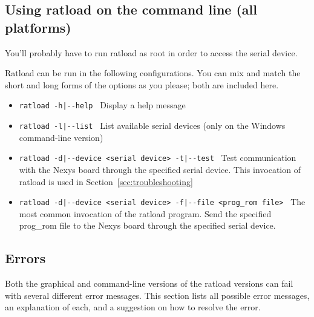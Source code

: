 \documentclass[notitlepage]{article}
\newcommand{\infosign}{\fontencoding{U}\fontfamily{futs}\huge\selectfont\char 116\relax}
\begin{document}
\subsection{Using ratload on the command line (all platforms)}
\begin{infobox}
  {\infosign}You'll probably have to run ratload as root in order to access the serial device.
\end{infobox}
Ratload can be run in the following configurations. You can mix and match the short and long forms of the options as you please; both are included here.
\begin{itemize}
\item \texttt{ratload -h|-{}-help} ~Display a help message
\item \texttt{ratload -l|-{}-list} ~List available serial devices (only on the Windows command-line version)
\item \texttt{ratload -d|-{}-device <serial device> -t|-{}-test} ~Test communication with the Nexys board through the specified serial device. This invocation of ratload is used in Section~\ref{sec:troubleshooting}
\item \texttt{ratload -d|-{}-device <serial device> -f|-{}-file <prog\_rom file>} ~The most common invocation of the ratload program. Send the specified prog\_rom file to the Nexys board through the specified serial device.
\end{itemize}

\subsection{Errors}
Both the graphical and command-line versions of the ratload versions can fail with several different error messages. This section lists all possible error messages, an explanation of each, and a suggestion on how to resolve the error.
\end{document}
